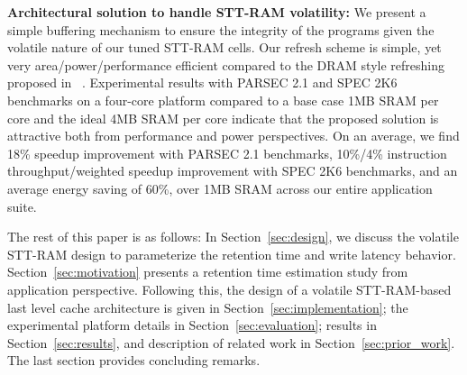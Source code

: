 \noindent\textbf{Architectural solution to handle STT-RAM volatility:} We present a simple buffering
mechanism to ensure the integrity of the programs given the volatile nature of our tuned STT-RAM cells.
Our refresh scheme is simple, yet very area/power/performance efficient compared to the 
DRAM style refreshing proposed in ~\cite{STTRAM:HPCA11}.
Experimental results with PARSEC 2.1 and SPEC 2K6 benchmarks on a four-core platform
compared to a base case 1MB SRAM per core and the ideal 4MB SRAM per core indicate that the proposed
solution is attractive both from performance and power perspectives. On an average, we find 18\% speedup
improvement with PARSEC 2.1 benchmarks, 10\%/4\% instruction throughput/weighted speedup improvement
with SPEC 2K6 benchmarks, and an average energy saving of 60\%, over 1MB SRAM across our entire application suite.




The rest of this paper is as follows: In Section~\ref{sec:design}, we discuss the volatile STT-RAM design to
parameterize the retention time and write latency behavior. Section~\ref{sec:motivation} presents a retention time
estimation study from application perspective. Following this, the design of a volatile STT-RAM-based last
level cache architecture is given in Section~\ref{sec:implementation}; the experimental platform details in Section~\ref{sec:evaluation};
results in Section~\ref{sec:results}, and description of related work in Section~\ref{sec:prior_work}.
The last section provides concluding remarks.



